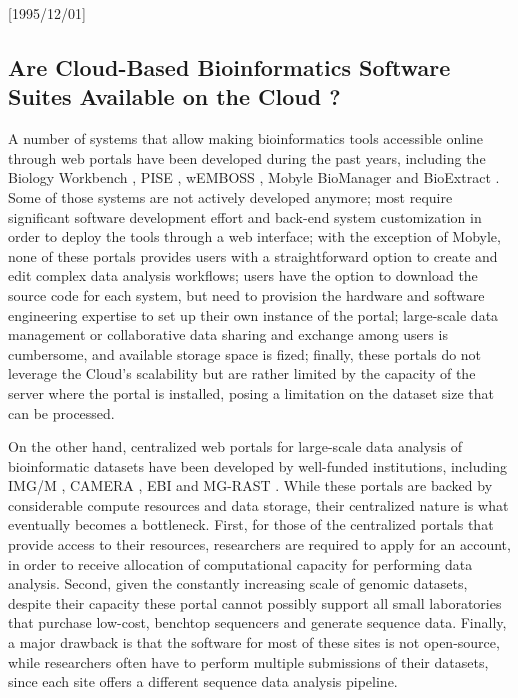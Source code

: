 \NeedsTeXFormat{LaTeX2e}[1995/12/01] \documentclass[10pt]{bmc_article}
\newenvironment{bmcformat}{\begin{raggedright}\baselineskip20pt\sloppy\setboolean{publ}{false}}{\end{raggedright}\baselineskip20pt\sloppy}
\begin{document}
\begin{bmcformat}
\subsection*{Are Cloud-Based Bioinformatics Software Suites Available on the Cloud ?}
  
A number of systems that allow making bioinformatics tools accessible online through web portals have been 
developed during the past years, including the Biology Workbench \cite{Subramaniam1998Biology}, 
PISE \cite{Letondal2001Web}, wEMBOSS \cite{Sarachu2005WEMBOSS}, Mobyle \cite{Neron2009Mobyle}
BioManager \cite{Cattley2007BioManager} and BioExtract \cite{Lushbough2008Implementing}. Some 
of those systems are not actively developed anymore; most require significant software development effort 
and back-end system customization in order to deploy the tools through a web interface; with the exception of Mobyle, 
none of these portals provides users with a straightforward option to create and edit complex data analysis workflows; 
users have the option to download the source code for each system, but need to provision the hardware and
software engineering expertise to set up their own instance of the portal; large-scale data management or collaborative
data sharing and exchange among users is cumbersome, and available storage space is fized; finally, these portals do 
not leverage the Cloud's  scalability but are rather limited by the capacity of the server where the portal is installed, 
posing a limitation on the dataset size that can be processed.  \pb

On the other hand, centralized web portals for large-scale data analysis of bioinformatic datasets have been developed by 
well-funded institutions, including IMG/M \cite{Grigoriev2012}, CAMERA \cite{Altintas2010}, EBI \cite{Hunter2011} 
and MG-RAST \cite{Aziz2010}. While these portals are backed by considerable compute resources and data storage,  
their centralized nature is what eventually becomes a bottleneck. First, for those of the centralized portals that provide 
access to their resources, researchers  are required to apply for an account, in order to receive allocation of computational 
capacity for performing data analysis. Second, given the constantly increasing scale of genomic datasets, despite their 
capacity these portal cannot possibly support all small laboratories that purchase low-cost, benchtop sequencers and 
generate sequence data. Finally, a major drawback is that the software for most of these sites is not  open-source, while 
researchers often have to perform multiple submissions of their datasets, since each site offers a different sequence data 
analysis pipeline.  \pb 


\end{bmcformat}
\end{document}
